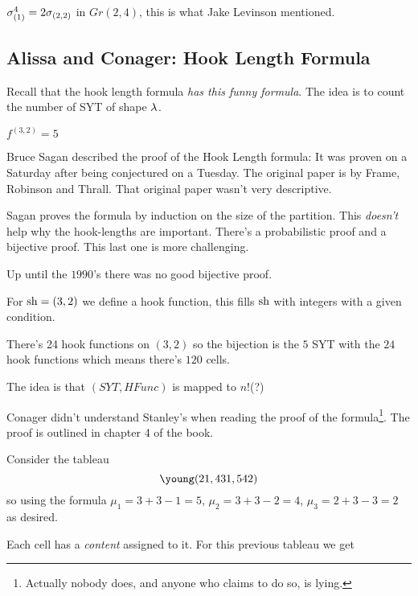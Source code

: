 \documentclass[12pt]{memoir}
\begin{document}
\begin{Ex}
    $\sigma_{(1)}^4=2\sigma_{(2,2)}$ in $Gr(2,4)$, this is what Jake Levinson mentioned. 
\end{Ex}

\subsection{Alissa and Conager: Hook Length Formula}

Recall that the hook length formula \emph{has this funny formula}. The idea is to count the number of SYT of shape $\lambda$.

\begin{Ex}
    $f^{(3,2)}=5$
\end{Ex}

Bruce Sagan described the proof of the Hook Length formula: It was proven on a Saturday after being conjectured on a Tuesday. The original paper is by Frame, Robinson and Thrall. That original paper wasn't very descriptive.\par 
Sagan proves the formula by induction on the size of the partition. This \emph{doesn't} help why the hook-lengths are important. There's a probabilistic proof and a bijective proof. This last one is more challenging.\par 
Up until the $1990$'s there was no good bijective proof.

\begin{Ex}
    For $\operatorname{sh}=(3,2)$ we define a hook function, this fills $\operatorname{sh}$ with integers with a given condition.\par 
    There's 24 hook functions on $(3,2)$ so the bijection is the $5$ SYT with the $24$ hook functions which means there's $120$ cells.\par 
    The idea is that $(SYT,HFunc)$ is mapped to $n!$(?)
\end{Ex}

Conager didn't understand Stanley's \cite{StanleyEnum1} when reading the proof of the formula\footnote{Actually nobody does, and anyone who claims to do so, is lying.}. The proof is outlined in chapter 4 of the book.

\begin{Ex}
    Consider the tableau
    $$\young(21,431,542)$$
    so using the formula $\mu_1=3+3-1=5$, $\mu_2=3+3-2=4$, $\mu_3=2+3-3=2$ as desired. 
\end{Ex}

Each cell has a \emph{content} assigned to it. For this previous tableau we get 
\end{document}
